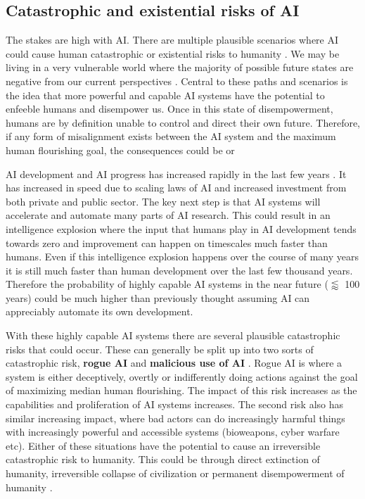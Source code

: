 \subsection{Catastrophic and existential risks of AI}

The stakes are high with AI. There are multiple plausible scenarios where AI could cause human catastrophic or existential risks to humanity \cite{yudkowskyIfAnyoneBuilds2025,kasirzadehTwoTypesAI2025,kulveitGradualDisempowermentSystemic2025,oheigeartaighExtinctionHumanSpecies2025,bostromSuperintelligencePathsDangers2014a,bengioManagingExtremeAI2024}. We may be living in a very vulnerable world where the majority of possible future states are negative from our current perspectives \cite{bostromVulnerableWorldHypothesis2019,manheimFragileWorldHypothesis2020}. Central to these paths and scenarios is the idea that more powerful and capable AI systems have the potential to enfeeble humans and disempower us. Once in this state of disempowerment, humans are by definition unable to control and direct their own future. Therefore, if any form of misalignment exists between the AI system and the maximum human flourishing goal, the consequences could be  or 

AI development and AI progress has increased rapidly in the last few years \cite{kwaMeasuringAIAbility2025}. It has increased in speed due to scaling laws of AI \cite{kaplanScalingLawsNeural2020} and increased investment from both private and public sector. The key next step is that AI systems will accelerate and automate many parts of AI research. This could result in an intelligence explosion \cite{bostromSuperintelligencePathsDangers2014a,SpeculationsConcerningFirst1966} where the input that humans play in AI development tends towards zero and improvement can happen on timescales much faster than humans. Even if this intelligence explosion happens over the course of many years it is still much faster than human development over the last few thousand years. Therefore the probability of highly capable AI systems in the near future ($\lessapprox$ 100 years) could be much higher than previously thought assuming AI can appreciably automate its own development.

With these highly capable AI systems there are several plausible catastrophic risks that could occur. These can generally be split up into two sorts of catastrophic risk, \textbf{rogue AI} and \textbf{malicious use of AI} \cite{hendrycksOverviewCatastrophicAI2023}. Rogue AI is where a system is either deceptively, overtly or indifferently doing actions against the goal of maximizing median human flourishing. The impact of this risk increases as the capabilities and proliferation of AI systems increases. The second risk also has similar increasing impact, where bad actors can do increasingly harmful things with increasingly powerful and accessible systems (bioweapons, cyber warfare etc). Either of these situations have the potential to cause an irreversible catastrophic risk to humanity. This could be through direct extinction of humanity, irreversible collapse of civilization or permanent disempowerment of humanity \cite{bostromSuperintelligencePathsDangers2014a}.

